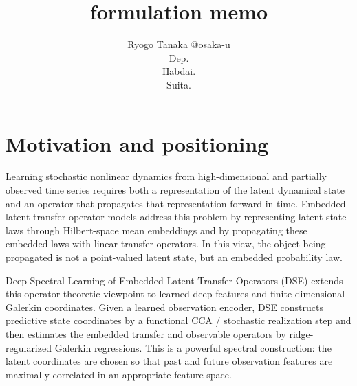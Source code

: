 \documentclass[twoside,11pt]{article}
\begin{document}
\title{formulation memo}

\author{\name Ryogo Tanaka \email @osaka-u \\
       \addr Dep.\\
       Habdai.\\
       Suita.
       }


\maketitle



\section{Motivation and positioning}
\label{sec:motivation}

Learning stochastic nonlinear dynamics from high-dimensional and
partially observed time series requires both a representation of the
latent dynamical state and an operator that propagates that
representation forward in time. Embedded latent transfer-operator
models address this problem by representing latent state laws through
Hilbert-space mean embeddings and by propagating these embedded laws
with linear transfer operators. In this view, the object being propagated
is not a point-valued latent state, but an embedded probability law.

Deep Spectral Learning of Embedded Latent Transfer Operators (DSE)
extends this operator-theoretic viewpoint to learned deep features and
finite-dimensional Galerkin coordinates. Given a learned observation
encoder, DSE constructs predictive state coordinates by a functional
CCA / stochastic realization step and then estimates the embedded
transfer and observable operators by ridge-regularized Galerkin
regressions. This is a powerful spectral construction: the latent
coordinates are chosen so that past and future observation features are
maximally correlated in an appropriate feature space.
\end{document}
